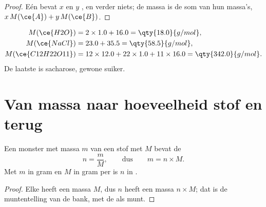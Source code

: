 \begin{proof}
Eén    bevat $x$    en $y$ 
 , en verder niets; de massa is de som van hun massa's,
$x\,M(\ce{A}) + y\,M(\ce{B})$.
\end{proof}

\begin{example}\label{ex:g10:the-mole:three}
\begin{align*}
  M(\ce{H2O}) &= 2 \times 1.0 + 16.0 = \qty{18.0}{g/mol},\\
  M(\ce{NaCl}) &= 23.0 + 35.5 = \qty{58.5}{g/mol},\\
  M(\ce{C12H22O11}) &= 12 \times 12.0 + 22 \times 1.0 + 11 \times 16.0
     = \qty{342.0}{g/mol}.
\end{align*}
De laatste is sacharose, gewone suiker.
\end{example}

\section{Van massa naar hoeveelheid stof en terug}

\begin{proposition}\label{prop:g10:the-mole:mass}
Een monster met massa $m$ van een stof met  $M$ bevat de
\[
  n = \frac{m}{M}, \qquad\text{dus}\qquad m = n \times M .
\]
Met $m$ in gram en $M$ in gram per  is $n$ in .
\end{proposition}

\begin{proof}
Elke  heeft een massa $M$, dus $n$  heeft een massa $n \times M$;
dat is de muntentelling van de bank, met de  als munt.
\end{proof}

